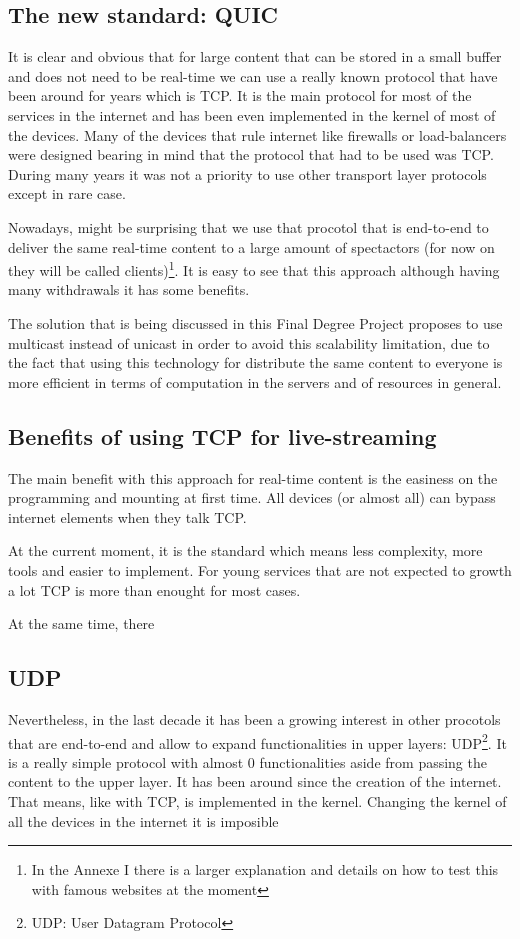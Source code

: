 \subsection{The new standard: QUIC}
{
    
    It is clear and obvious that for large content that can be stored in a small buffer and does not need to be real-time we can use a really known 
    protocol that have been around for years which is TCP. It is the main protocol for most of the services in the internet and has been even implemented
    in the kernel of most of the devices. Many of the devices that rule internet like firewalls or load-balancers were designed bearing in mind that the
    protocol that had to be used was TCP. During many years it was not a priority to use other transport layer protocols except in rare case.

    Nowadays, might be surprising that we use that procotol that is end-to-end to deliver the same real-time content to a large amount of spectactors (for
    now on they will be called clients)\footnote{In the Annexe I there is a larger explanation and details on how to test this with famous websites at the
    moment}. It is easy to see that this approach although having many withdrawals it has some benefits.

    The solution that is being discussed in this Final Degree Project proposes to use multicast instead of unicast in order to avoid this scalability limitation, due to
    the fact that using this technology for distribute the same content to everyone is more efficient in terms of computation in the servers and of resources in general.
}

\subsection{Benefits of using TCP for live-streaming}
{
    The main benefit with this approach for real-time content is the easiness on the programming and mounting at first time. All devices (or almost all) can
    bypass internet elements when they talk TCP. 
 
    
    At the current moment, it is the standard which means less complexity, more tools and easier to implement. For
    young services that are not expected to growth a lot TCP is more than enought for most cases.

    At the same time, there 
}

\subsection{UDP}{
    
    Nevertheless, in the last decade it has been a growing interest in other procotols that are end-to-end and allow to expand functionalities in upper layers:
    UDP\footnote{UDP: User Datagram Protocol}. It is a really simple protocol with almost 0 functionalities aside from passing the content to the upper layer.
    It has been around since the creation of the internet. That means, like with TCP, is implemented in the kernel. Changing the kernel of all the devices in
    the internet it is imposible 
}

